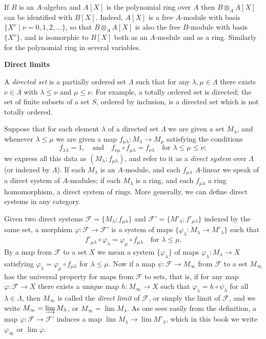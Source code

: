 \begin{example*}
If $B$ is an $A$-algebra and $A[X]$ is the polynomial ring over $A$ then
$B \otimes_A A[X]$ can be identified with $B[X]$. Indeed, $A[X]$ is a free $A$-module
with basis $\{X^\nu \mid \nu = 0, 1, 2, \ldots\}$, so that $B \otimes_A A[X]$ is also the free $B$-module
with basis $\{X^\nu\}$, and is isomorphic to $B[X]$ both as an $A$-module and as a
ring. Similarly for the polynomial ring in several variables.
\end{example*}

\medskip
\noindent\textbf{Direct limits}

A \emph{directed set} is a partially ordered set $\Lambda$ such that for any
$\lambda, \mu \in \Lambda$ there exists $\nu \in \Lambda$ with $\lambda \le \nu$ and $\mu \le \nu$. For example, a
totally ordered set is directed; the set of finite subsets of a set $S$, ordered by
inclusion, is a directed set which is not totally ordered.

Suppose that for each element $\lambda$ of a directed set $\Lambda$ we are given a set $M_\lambda$,
and whenever $\lambda \le \mu$ we are given a map $f_{\mu\lambda}\colon M_\lambda \to M_\mu$ satisfying the
conditions
\[
  f_{\lambda\lambda} = 1, \quad \text{and} \quad f_{\nu\mu} \circ f_{\mu\lambda} = f_{\nu\lambda}
      \quad \text{for } \lambda \le \mu \le \nu;
\]
we express all this data as $(M_\lambda; f_{\mu\lambda})$, and refer to it as a \emph{direct system}
over $\Lambda$ (or indexed by $\Lambda$). If each $M_\lambda$ is an $A$-module, and each $f_{\mu\lambda}$
$A$-linear we speak of a direct system of $A$-modules; if each $M_\lambda$ is a ring,
and each $f_{\mu\lambda}$ a ring homomorphism, a direct system of rings. More generally,
we can define direct systems in any category.

Given two direct systems $\mathcal{F} = \{M_\lambda; f_{\mu\lambda}\}$ and
$\mathcal{F}' = \{M'_\lambda; f'_{\mu\lambda}\}$ indexed by the same set, a morphism
$\varphi\colon \mathcal{F} \to \mathcal{F}'$ is a system of maps $\{\varphi_\lambda\colon M_\lambda \to M'_\lambda\}$ such that
\[
  f'_{\mu\lambda} \circ \varphi_\lambda = \varphi_\mu \circ f_{\mu\lambda} \quad \text{for } \lambda \le \mu.
\]
By a map from $\mathcal{F}$ to a set $X$ we mean a system $\{\varphi_\lambda\}$ of maps
$\varphi_\lambda\colon M_\lambda \to X$ satisfying $\varphi_\lambda = \varphi_\mu \circ f_{\mu\lambda}$ for $\lambda \le \mu$. Now if a
map $\psi\colon \mathcal{F} \to M_\infty$ from $\mathcal{F}$ to a set $M_\infty$ has the universal property for maps
from $\mathcal{F}$ to sets, that is, if for any map $\varphi\colon \mathcal{F} \to X$ there exists a unique
map $h\colon M_\infty \to X$ such that $\varphi_\lambda = h \circ \psi_\lambda$ for all $\lambda \in \Lambda$, then $M_\infty$ is called
the \emph{direct limit} of $\mathcal{F}$, or simply the limit of $\mathcal{F}$, and we write
$M_\infty = \varinjlim M_\lambda$, or $M_\infty = \lim M_\lambda$. As one sees easily from the definition, a map
$\varphi\colon \mathcal{F} \to \mathcal{F}'$ induces a map $\lim M_\lambda \to \lim M'_\lambda$, which in this book we write
$\varphi_\infty$ or $\lim \varphi$.

